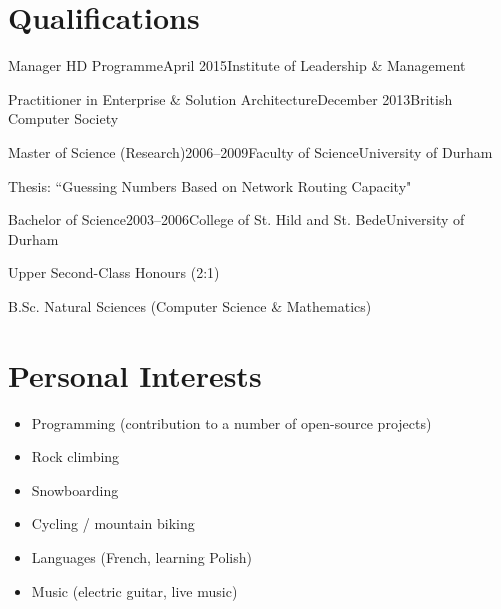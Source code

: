 \documentclass{cv}
\begin{document}

\section{Qualifications}

\begin{experienceplain}{Manager HD Programme}{April 2015}{Institute of Leadership \& Management}{}
\end{experienceplain}

\begin{experienceplain}{Practitioner in Enterprise \& Solution Architecture}{December 2013}{British Computer Society}{}
\end{experienceplain}

\begin{experience}{Master of Science (Research)}{2006--2009}{Faculty of Science}{University of Durham}
\item Thesis: ``Guessing Numbers Based on Network Routing Capacity"
\end{experience}

\begin{experience}{Bachelor of Science}{2003--2006}{College of St. Hild and St. Bede}{University of Durham}
\item Upper Second-Class Honours (2:1)
\item B.Sc. Natural Sciences (Computer Science \& Mathematics)
\end{experience}


\section{Personal Interests}

\begin{itemize}
\item Programming (contribution to a number of open-source projects)
\item Rock climbing
\item Snowboarding
\item Cycling / mountain biking
\item Languages (French, learning Polish)
\item Music (electric guitar, live music)
\end{itemize}
\end{document}
